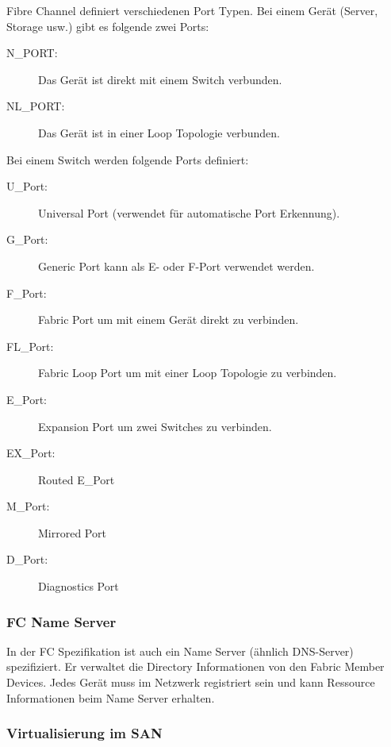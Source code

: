 \noindent
Fibre Channel definiert verschiedenen Port Typen. Bei einem Gerät (Server, Storage usw.) gibt es folgende zwei Ports:
\begin{description}
	\item[N\_PORT:] Das Gerät ist direkt mit einem Switch verbunden.
	\item[NL\_PORT:] Das Gerät ist in einer Loop Topologie verbunden.
\end{description}
Bei einem Switch werden folgende Ports definiert:
\begin{description}
	\item[U\_Port:] Universal Port (verwendet für automatische Port Erkennung).
	\item[G\_Port:] Generic Port kann als E- oder F-Port verwendet werden.
	\item[F\_Port:] Fabric Port um mit einem Gerät direkt zu verbinden.
	\item[FL\_Port:] Fabric Loop Port um mit einer Loop Topologie zu verbinden.
	\item[E\_Port:] Expansion Port um zwei Switches zu verbinden.
	\item[EX\_Port:] Routed E\_Port
	\item[M\_Port:] Mirrored Port
	\item[D\_Port:] Diagnostics Port
\end{description}

\subsubsection{FC Name Server}

In der FC Spezifikation ist auch ein Name Server (ähnlich DNS-Server) spezifiziert. Er verwaltet die Directory Informationen von den Fabric Member Devices. Jedes Gerät muss im Netzwerk registriert sein und kann Ressource Informationen beim Name Server erhalten.

\subsubsection{Virtualisierung im SAN}

